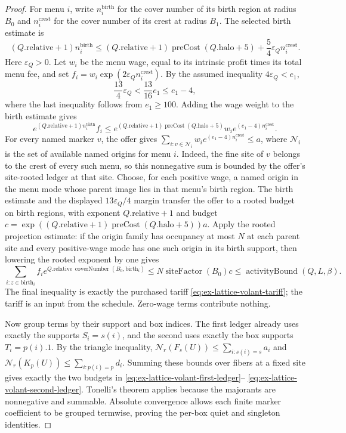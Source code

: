 \begin{proof}
For menu $i$, write $n_i^{\mathrm{birth}}$ for the cover number of its
birth region at radius $B_0$ and $n_i^{\mathrm{crest}}$ for the cover
number of its crest at radius $B_1$. The selected birth estimate is
\[
 (Q.\mathrm{relative}+1)n_i^{\mathrm{birth}}
 \leq (Q.\mathrm{relative}+1)\operatorname{preCost}(Q.\mathrm{halo}+5)
       +\frac54\varepsilon_Q n_i^{\mathrm{crest}}.
\]
Here $\varepsilon_Q>0$. Let $w_i$ be the menu wage, equal to its intrinsic
profit times its total menu fee, and set
$f_i=w_i\exp(2\varepsilon_Q n_i^{\mathrm{crest}})$. By the assumed inequality $4\varepsilon_Q<e_1$,
\[
 \frac{13}{4}\varepsilon_Q<\frac{13}{16}e_1\leq e_1-4,
\]
where the last inequality follows from $e_1\geq100$. Adding the wage
weight to the birth estimate gives
\[
 e^{(Q.\mathrm{relative}+1)n_i^{\mathrm{birth}}} f_i
 \leq e^{(Q.\mathrm{relative}+1)\operatorname{preCost}(Q.\mathrm{halo}+5)}
       w_i e^{(e_1-4)n_i^{\mathrm{crest}}}.
\]
For every named marker $v$, the offer gives
$\sum_{i:v\in \mathcal N_i}w_i e^{(e_1-4)n_i^{\mathrm{crest}}}\leq a$,
where $\mathcal N_i$ is the set of available named origins for menu $i$. Indeed,
the fine site of $v$ belongs to the crest of every such menu, so this
nonnegative sum is bounded by the offer's site-rooted ledger at that site.
Choose, for each positive wage, a named origin in the
menu mode whose parent image lies in that menu's birth region. The birth
estimate and the displayed $13\varepsilon_Q/4$ margin transfer the offer
to a rooted budget on birth regions, with exponent
$Q.\mathrm{relative}+1$ and budget
$c=\exp((Q.\mathrm{relative}+1)\operatorname{preCost}(Q.\mathrm{halo}+5))a$.
Apply the rooted projection estimate: if the origin family has occupancy at
most $N$ at each parent site and every positive-wage mode has one such
origin in its birth support, then lowering the rooted exponent by one gives
\begin{equation}
 \sum_{i:z\in\mathrm{birth}_i}f_i
       e^{Q.\mathrm{relative}\,\operatorname{coverNumber}(B_0,\mathrm{birth}_i)}
 \leq N\operatorname{siteFactor}(B_0)c
 \leq\operatorname{activityBound}(Q,L,\beta).
 \label{eq:ex-lattice-volant-root-lift}
\end{equation}
The final inequality is exactly the purchased tariff
\eqref{eq:ex-lattice-volant-tariff}; the tariff is an input from the
schedule. Zero-wage terms contribute nothing.

Now group terms by their support and box indices. The first ledger already
uses exactly the supports $S_i=s(i)$, and the second uses exactly the box
supports $T_i=p(i).1$. By the triangle
inequality,
$\mathcal N_r(F_s(U))\leq\sum_{i:s(i)=s}a_i$ and
$\mathcal N_r(K_p(U))\leq\sum_{i:p(i)=p}d_i$. Summing these
bounds over fibers at a fixed site gives exactly the two budgets in
\eqref{eq:ex-lattice-volant-first-ledger}--
\eqref{eq:ex-lattice-volant-second-ledger}. Tonelli's theorem applies
because the majorants are nonnegative and summable. Absolute convergence
allows each finite marker coefficient to be grouped termwise, proving the
per-box quiet and singleton identities.


\end{proof}

